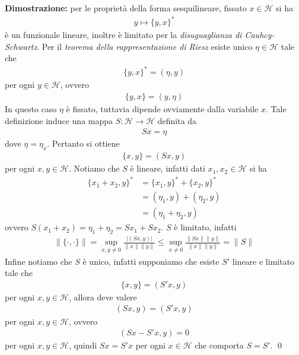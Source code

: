 \documentclass{article}
\numberwithin{equation}{subsection}
\begin{document}
\textbf{Dimostrazione:} per le proprietà della forma sesquilineare, fissato $x \in \mathcal{H}$ si ha 
\begin{align*}
    y \mapsto \{y, x\}^* 
\end{align*}
è un funzionale lineare, inoltre è limitato per la \textit{disuguaglianza di Cauhcy-Schwartz}. Per il \textit{teorema della rappresentazione di Riesz} esiste unico $\eta \in \mathcal{H}$ tale che 
\begin{align*}
    \{y, x\}^* = (\eta, y) 
\end{align*}
per ogni $y \in \mathcal{H}$, ovvero 
\begin{align*}
    \{y, x\} = (y, \eta) 
\end{align*}
In questo caso $\eta$ è fissato, tuttavia dipende ovviamente dalla variabile $x$. Tale definizione induce una mappa $S : \mathcal{H} \longrightarrow \mathcal{H}$ definita da 
\begin{align*}
    Sx = \eta 
\end{align*}
dove $\eta = \eta_x$. Pertanto si ottiene 
\begin{align*}
    \{x, y\} = (Sx, y) 
\end{align*}
per ogni $x, y \in \mathcal{H}$. Notiamo che $S$ è lineare, infatti dati $x_1, x_2 \in \mathcal{H}$ si ha 
\begin{align*}
    \{x_1 + x_2, y\}^* &= \{x_1, y\}^* + \{x_2, y\}^*  \\
    &= (\eta_1, y) + (\eta_2, y)  \\
    &= (\eta_1 + \eta_2, y) 
\end{align*}
ovvero $S(x_1 + x_2) = \eta_1 + \eta_2 = Sx_1 + Sx_2$. $S$ è limitato, infatti 
\begin{align*}
    \|\{\cdot, \cdot\}\| = \sup_{x, y \neq 0}\frac{|(Sx, y)|}{\|x\|\|y\|} \leq \sup_{x \neq 0}\frac{\|Sx\|\|y\|}{\|x\|\|y\|} = \|S\| 
\end{align*}
Infine notiamo che $S$ è unico, infatti supponiamo che esiste $S'$ lineare e limitato tale che 
\begin{align*}
    \{x, y\} = (S'x, y)  
\end{align*}
per ogni $x, y \in \mathcal{H}$, allora deve valere 
\begin{align*}
    (Sx, y) = (S'x, y) 
\end{align*}
per ogni $x, y \in \mathcal{H}$, ovvero 
\begin{align*}
    (Sx - S'x, y) = 0 
\end{align*}
per ogni $x, y \in \mathcal{H}$, quindi $Sx = S'x$ per ogni $x \in \mathcal{H}$ che comporta $S = S'$. \qed
\end{document}
